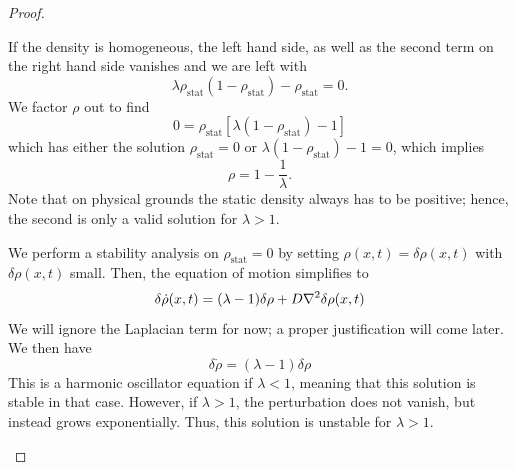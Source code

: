 \begin{proof}
	\begin{parts}
	\item If the density is homogeneous, the left hand side, as well as the second term on the right hand side vanishes and we are left with
		\[
			\lambda\rho_\text{stat}(1-\rho_\text{stat})-\rho_\text{stat} = 0
		.\] 
		We factor $\rho$ out to find
		\[
			0 = \rho_\text{stat}[\lambda(1-\rho_\text{stat})-1] 
		\] 
		which has either the solution $\rho_\text{stat} = 0$ or $\lambda(1-\rho_\text{stat})-1=0$, which implies
		\[
		\rho = 1 - \frac 1\lambda
		.\] 
		Note that on physical grounds the static density always has to be positive; hence, the second is only a valid solution for $\lambda>1$.
		
		We perform a stability analysis on $\rho_\text{stat}=0$ by setting $\rho(x, t)=\delta \rho(x,t)$ with $\delta\rho(x,t)$ small. Then, the equation of motion simplifies to
		\[\delta\dot{\rho}(x,t) = (\lambda-1)\delta\rho +D \laplacian{\delta\rho(x,t)}\]
		We will ignore the Laplacian term for now; a proper justification will come later. We then have
		\[\delta\dot{\rho} = (\lambda-1)\delta\rho\]
		This is a harmonic oscillator equation if $\lambda<1$, meaning that this solution is stable in that case. However, if $\lambda>1$, the perturbation does not vanish, but instead grows exponentially. Thus, this solution is unstable for $\lambda>1$. 
		

\end{parts}
\end{proof}
